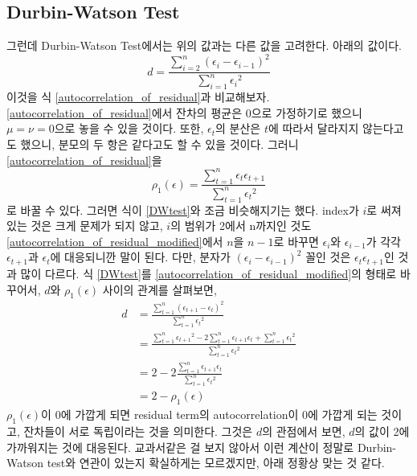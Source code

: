 \documentclass{article}
\begin{document}
\subsection{Durbin-Watson Test}
그런데 Durbin-Watson Test에서는 위의 값과는 다른 값을 고려한다.
아래의 값이다.
\begin{equation}\label{DWtest}
d = \frac{\sum_{i=2}^n(\epsilon_i-\epsilon_{i-1})^2}{\sum_{i=1}^n{\epsilon_i}^2}
\end{equation}
이것을 식 \eqref{autocorrelation_of_residual}과 비교해보자.
\eqref{autocorrelation_of_residual}에서 잔차의 평균은 0으로 가정하기로 했으니 \(\mu=\nu=0\)으로 놓을 수 있을 것이다.
또한, \(\epsilon_t\)의 분산은 \(t\)에 따라서 달라지지 않는다고도 했으니, 분모의 두 항은 같다고도 할 수 있을 것이다.
그러니 \eqref{autocorrelation_of_residual}을
\begin{equation}\label{autocorrelation_of_residual_modified}
\rho_1(\epsilon)=\frac{\sum_{t=1}^n\epsilon_t\epsilon_{t+1}}{\sum_{t=1}^n{\epsilon_t}^2}
\end{equation}
로 바꿀 수 있다.
그러면 식이 \eqref{DWtest}와 조금 비슷해지기는 했다.
index가 $i$로 써져있는 것은 크게 문제가 되지 않고, $i$의 범위가 2에서 n까지인 것도 \eqref{autocorrelation_of_residual_modified}에서 $n$을 $n-1$로 바꾸면 \(\epsilon_i\)와 \(\epsilon_{i-1}\)가 각각 \(\epsilon_{t+1}\)과 \(\epsilon_t\)에 대응되니깐 말이 된다.
다만, 분자가 \((\epsilon_i-\epsilon_{i-1})^2\) 꼴인 것은 \(\epsilon_t\epsilon_{t+1}\)인 것과 많이 다르다.
식 \eqref{DWtest}를 \eqref{autocorrelation_of_residual_modified}의 형태로 바꾸어서, \(d\)와 \(\rho_1(\epsilon)\) 사이의 관계를 살펴보면,
\begin{equation}\label{relation_between_d_and_rho}
\begin{aligned}
d
&=\frac{\sum_{t=1}^n(\epsilon_{t+1}-\epsilon_t)^2}{\sum_{t=1}^n{\epsilon_t}^2}\\
&=\frac{\sum_{t=1}^n{\epsilon_{t+1}}^2-2\sum_{t=1}^n\epsilon_{t+1}\epsilon_t+\sum_{t=1}^n{\epsilon_t}^2}{\sum_{t=1}^n{\epsilon_t}^2}\\
&=2-2\frac{\sum_{t=1}^n\epsilon_{t+1}\epsilon_t}{\sum_{t=1}^n{\epsilon_t}^2}\\
&=2-\rho_1(\epsilon)
\end{aligned}
\end{equation}
\(\rho_1(\epsilon)\)이 0에 가깝게 되면 residual term의 autocorrelation이 0에 가깝게 되는 것이고, 잔차들이 서로 독립이라는 것을 의미한다.
그것은 \(d\)의 관점에서 보면, \(d\)의 값이 2에 가까워지는 것에 대응된다.
교과서같은 걸 보지 않아서 이런 계산이 정말로 Durbin-Watson test와 연관이 있는지 확실하게는 모르겠지만, 아래 정황상 맞는 것 같다.
\end{document}
